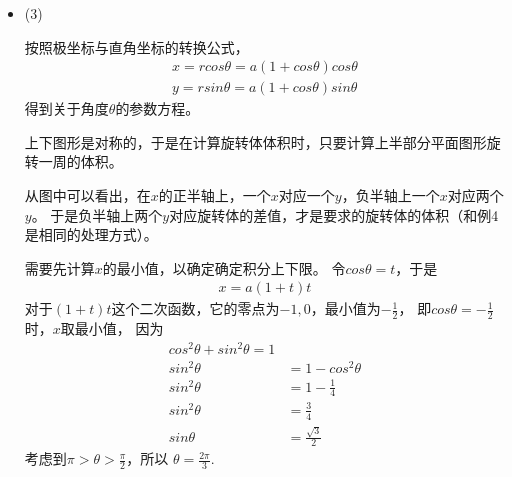 \documentclass{article}
\begin{document}
\begin{itemize}
  \item (3)


        按照极坐标与直角坐标的转换公式，
        \begin{align*}
          x = r cos \theta = a (1 + cos \theta) cos \theta \\
          y = r sin \theta = a (1 + cos \theta) sin \theta
        \end{align*}
        得到关于角度$\theta$的参数方程。

        上下图形是对称的，于是在计算旋转体体积时，只要计算上半部分平面图形旋转一周的体积。

        从图中可以看出，在$x$的正半轴上，一个$x$对应一个$y$，负半轴上一个$x$对应两个$y$。
        于是负半轴上两个$y$对应旋转体的差值，才是要求的旋转体的体积（和例4是相同的处理方式）。

        需要先计算$x$的最小值，以确定确定积分上下限。
        令$cos \theta = t$，于是
        \begin{align*}
          x = a (1 + t) t
        \end{align*}
        对于$(1 + t)t$这个二次函数，它的零点为$-1, 0$，最小值为$- \frac{1}{2}$，
        即$cos \theta = - \frac{1}{2}$时，$x$取最小值，
        因为
        \begin{align*}
          cos^2 \theta + sin^2 \theta = 1     \\
          sin^2 \theta & = 1 - cos^2 \theta   \\
          sin^2 \theta & = 1 - \frac{1}{4}    \\
          sin^2 \theta & = \frac{3}{4}        \\
          sin \theta   & = \frac{\sqrt{3}}{2}
        \end{align*}
        考虑到$\pi > \theta > \frac{\pi}{2}$，所以
        $\theta = \frac{2\pi}{3}$.


\end{itemize}
\end{document}

